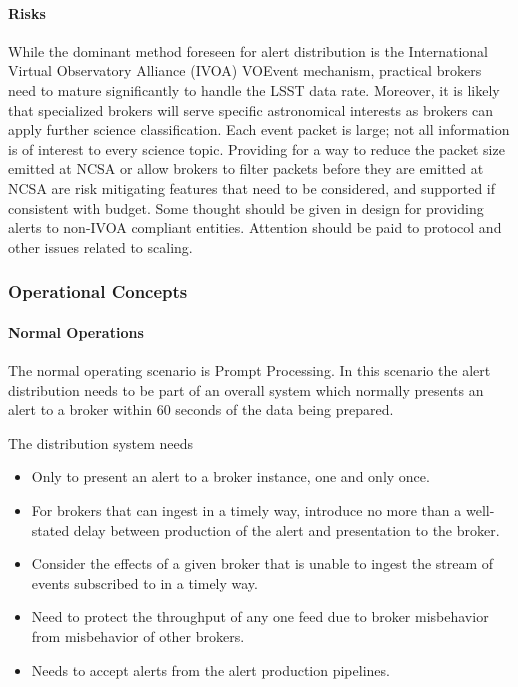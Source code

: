 \paragraph{Risks}
While the dominant method foreseen for alert distribution is the International Virtual Observatory Alliance (IVOA) VOEvent mechanism, practical brokers need to mature significantly to handle the LSST data rate. Moreover, it is likely that specialized brokers will serve specific astronomical interests as brokers can apply further science classification. Each event packet is large; not all information is of interest to every science topic. Providing for a way to reduce the packet size emitted at NCSA or allow brokers to filter packets before they are emitted at NCSA are risk mitigating features that need to be considered, and supported if consistent with budget. Some thought should be given in design for providing alerts to non-IVOA compliant entities. Attention should be paid to protocol and other issues related to scaling.

\subsubsection{Operational Concepts}

\paragraph{Normal Operations}
The normal operating scenario is Prompt Processing. In this scenario the alert distribution needs to be part of an overall system which normally presents an alert to a broker within 60 seconds of the data being prepared.

The distribution system needs

\begin{itemize}

\item Only to present an alert to a broker instance, one and only once.

\item For brokers that can ingest in a timely way, introduce no more than a well-stated delay between production of the alert and presentation to the broker.

\item Consider the effects of a given broker that is unable to ingest the stream of events subscribed to in a timely way.

\item Need to protect the throughput of any one feed due to broker misbehavior from misbehavior of other brokers.

\item Needs to accept alerts from the alert production pipelines.

\end{itemize}

